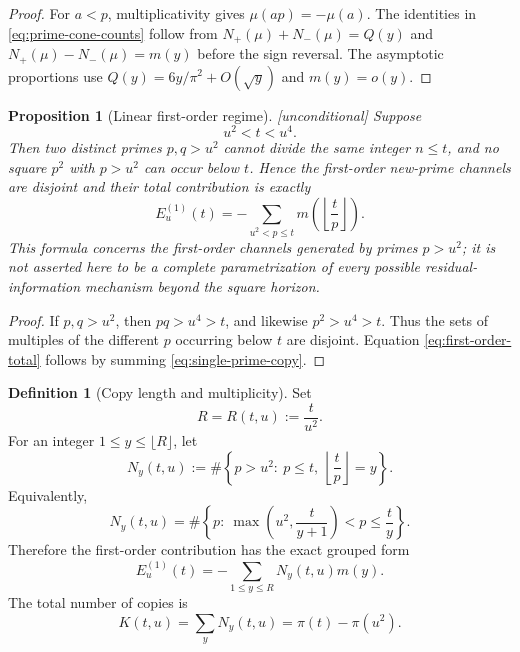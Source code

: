 \documentclass[11pt,reqno]{amsart}
\theoremstyle{plain}
\newtheorem{proposition}[theorem]{Proposition}
\theoremstyle{definition}
\newtheorem{definition}[theorem]{Definition}
\begin{document}
\begin{proof}
For $a<p$, multiplicativity gives $\mu(ap)=-\mu(a)$.  The identities in
\eqref{eq:prime-cone-counts} follow from
$N_+(\mu)+N_-(\mu)=Q(y)$ and
$N_+(\mu)-N_-(\mu)=m(y)$ before the sign reversal.  The asymptotic
proportions use $Q(y)=6y/\pi^2+O(\sqrt y)$ and $m(y)=o(y)$.
\end{proof}

\begin{proposition}[Linear first-order regime]
\label{prop:linear-new-primes}
\emph{[unconditional]} Suppose
\begin{equation}
\label{eq:linear-window}
  u^2<t<u^4.
\end{equation}
Then two distinct primes $p,q>u^2$ cannot divide the same integer $n\le t$,
and no square $p^2$ with $p>u^2$ can occur below $t$.  Hence the first-order
new-prime channels are disjoint and their total contribution is exactly
\begin{equation}
\label{eq:first-order-total}
  \boxed{\qquad
  E_u^{(1)}(t)
  =-\sum_{u^2<p\le t}
  m\!\left(\left\lfloor\frac{t}{p}\right\rfloor\right).
  \qquad}
\end{equation}
This formula concerns the first-order channels generated by primes $p>u^2$;
it is not asserted here to be a complete parametrization of every possible
residual-information mechanism beyond the square horizon.
\end{proposition}

\begin{proof}
If $p,q>u^2$, then $pq>u^4>t$, and likewise $p^2>u^4>t$.
Thus the sets of multiples of the different $p$ occurring below $t$ are
disjoint.  Equation \eqref{eq:first-order-total} follows by summing
\eqref{eq:single-prime-copy}.
\end{proof}

\begin{definition}[Copy length and multiplicity]
\label{def:copy-multiplicity}
Set
\[
  R=R(t,u):=\frac{t}{u^2}.
\]
For an integer $1\le y\le\lfloor R\rfloor$, let
\[
  N_y(t,u)
  :=\#\left\{p>u^2:\ p\le t,\
       \left\lfloor\frac{t}{p}\right\rfloor=y\right\}.
\]
Equivalently,
\begin{equation}
\label{eq:Ny-exact}
  N_y(t,u)
  =\#\left\{p:\
      \max\!\left(u^2,\frac{t}{y+1}\right)<p\le\frac{t}{y}
    \right\}.
\end{equation}
Therefore the first-order contribution has the exact grouped form
\begin{equation}
\label{eq:first-order-grouped}
  \boxed{\qquad
  E_u^{(1)}(t)=-\sum_{1\le y\le R}N_y(t,u)m(y).
  \qquad}
\end{equation}
The total number of copies is
\begin{equation}
\label{eq:copy-total}
  K(t,u)=\sum_yN_y(t,u)=\pi(t)-\pi(u^2).
\end{equation}
\end{definition}
\end{document}
